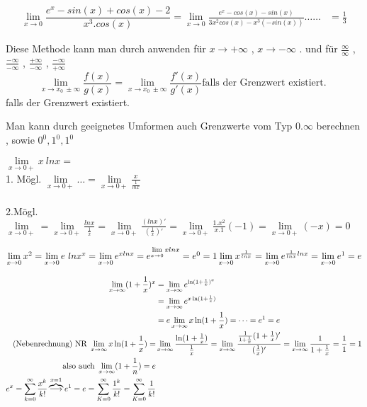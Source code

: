 \begin{example}
\begin{align*}
\lim_{x \to 0}{\dfrac{e^x - sin(x) + cos(x)-2}{x^3 . cos(x)}} 
= \lim_{x \to 0 }{\frac{e^x - cos(x) - sin(x)}{3x^2 cos(x)-x^3(-sin(x))}} \dots \dots &= \frac{1}{3}
\end{align*}
\end{example}
\begin{remark}
Diese Methode kann man durch anwenden für $x \to + \infty$ , $x \to - \infty$ . und für $\frac{\infty}{\infty}$ , $\frac{-\infty}{-\infty}$ , $\frac{+\infty}{-\infty}$ , $\frac{-\infty}{+\infty}$\\
\[ \lim_{x \to x_0 \ \pm \infty}{\frac{f(x)}{g(x)}}= 
\lim_{x \to x_0 \ \pm \infty}{\frac{f'(x)}{g'(x)}} \text{falls der Grenzwert existiert. }\]
falls der Grenzwert existiert. 
\end{remark}
\begin{remark}
Man kann durch geeignetes Umformen auch Grenzwerte vom Typ $0.\infty $ berechnen , sowie $0^0 , 1^0 , 1^0$
\end{remark}
 \begin{example}
$\lim\limits_{x \rightarrow 0+} x \ lnx=$\\
1. Mögl. $\lim\limits_{x \rightarrow 0+} \dots = \lim\limits_{x \rightarrow 0+}\frac{x}{\frac{1}{lnx}}$  \\ \\
2.Mögl. $\lim\limits_{x \rightarrow 0+}=\lim\limits_{x \rightarrow 0+}\frac{lnx}{\frac{1}{x}}=\lim\limits_{x \rightarrow 0+}\frac{(lnx)'}{(\frac{1}{x})'}= \lim\limits_{x \rightarrow 0+} \frac{1.x^2}{x.1}(-1)=\lim\limits_{x \rightarrow 0+}(-x)=0$
 \end{example}
\begin{example}
$\lim\limits_{x \rightarrow 0}x^2=\lim\limits_{x \rightarrow 0}e \ lnx^x= \lim\limits_{x \rightarrow 0}e^{xlnx}=e^{\lim\limits_{x \rightarrow 0} xlnx}=e^0=1 \\ \\
\lim\limits_{x \rightarrow 0}x^{\frac{1}{lnx}}= \lim\limits_{x \rightarrow 0} e^{\frac{1}{lnx}lnx}= \lim\limits_{x \rightarrow 0} e^1=e$
\end{example}
\begin{example}
	\begin{align*} 
	\lim\limits_{x \to \infty} (1+\frac{1}{x})^x &=\lim\limits_{x \to \infty} e^{\ln(1+\frac{1}{x})^x} \\	&=\lim\limits_{x \to \infty} e^{x \ln (1+\frac{1}{x})}\\
	&=e \lim\limits_{x \to \infty} x \ln (1+\frac{1}{x})= \dots = e^1=e \\	
	\text{(Nebenrechnung) NR }\lim\limits_{x \to \infty} x \ln (1+\frac{1}{x})=& \lim\limits_{x \to \infty}\frac{\ln (1+\frac{1}{x})}{\frac{1}{x}} = \lim\limits_{x \to \infty} \frac{\frac{1}{1+\frac{1}{x}}(1+\frac{1}{x})'}{(\frac{1}{x})'}= \lim\limits_{x \to \infty} \frac{1}{1+\frac{1}{x}}=\frac{1}{1}=1\\
	\text{also auch } \lim\limits_{x \to \infty} (1+\frac{1}{n})=e \\
	e^x = \sum_{k=0}^{\infty} \frac{x^k}{k!} \overbrace{\longrightarrow}^{x=1} e^1 =e= \sum_{K=0}^{\infty} \frac{1^k}{k!}= \sum_{K=0}^{\infty} \frac{1}{k!}
	\end{align*}
\end{example}
